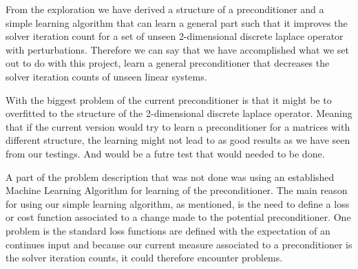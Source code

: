 
From the exploration we have derived a structure of a preconditioner and a simple learning algorithm that can learn a general part such that it improves the solver iteration count for a set of unseen 2-dimensional discrete laplace operator with perturbations. Therefore we can say that we have accomplished what we set out to do with this project, learn a general preconditioner that decreases the solver iteration counts of unseen linear systems.

With the biggest problem of the current preconditioner is that it might be to overfitted to the structure of the 2-dimensional discrete laplace operator. Meaning that if the current version would try to learn a preconditioner for a matrices with different structure, the learning might not lead to as good results as we have seen from our testings. And would be a futre test that would needed to be done.


A part of the problem description that was not done was using an established Machine Learning Algorithm for learning of the preconditioner. The main reason for using our simple learning algorithm, as mentioned, is the need to define a loss or cost function associated to a change made to the potential preconditioner. One problem is the standard loss functions are defined with the expectation of an continues input and because our current measure associated to a preconditioner is the solver iteration counts, it could therefore encounter problems.




